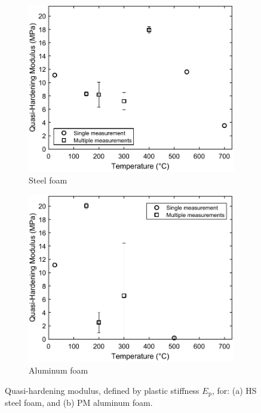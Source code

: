 \documentclass[review]{elsarticle}
\begin{document}
\begin{figure}
	\centering
	\begin{subfigure}{0.50\textwidth}
		\centering
		\includegraphics[width=0.90\linewidth]
		{Tex-Figures/Fig18a-quasi-Hardening-Fe.pdf}
		\caption{Steel foam}
		\label{fig:Quasi-hardening-modulus_Steel}
	\end{subfigure}%
	\begin{subfigure}{0.50\textwidth}
		\centering
		\includegraphics[width=0.90\linewidth]
		{Tex-Figures/Fig18b-quasi-Hardening-Al.pdf}
		\caption{Aluminum foam}
		\label{fig:Quasi-hardening-modulus_Al}
	\end{subfigure}
	\caption{Quasi-hardening modulus, defined by plastic stiffness $E_\text{p}$, for: (a) HS steel foam, and (b) PM aluminum foam.}
	\label{fig:Quasi-hardening-modulus}
\end{figure}
\end{document}
